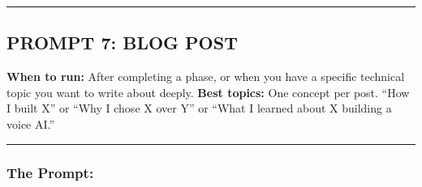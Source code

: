 \documentclass[
  11pt,
]{article}
\begin{document}
\begin{center}\rule{0.5\linewidth}{0.5pt}\end{center}

\hypertarget{prompt-7-blog-post}{%
\subsection{PROMPT 7: BLOG POST}\label{prompt-7-blog-post}}

\textbf{When to run:} After completing a phase, or when you have a
specific technical topic you want to write about deeply. \textbf{Best
topics:} One concept per post. ``How I built X'' or ``Why I chose X over
Y'' or ``What I learned about X building a voice AI.''

\begin{center}\rule{0.5\linewidth}{0.5pt}\end{center}

\hypertarget{the-prompt-6}{%
\subsubsection{The Prompt:}\label{the-prompt-6}}
\end{document}
